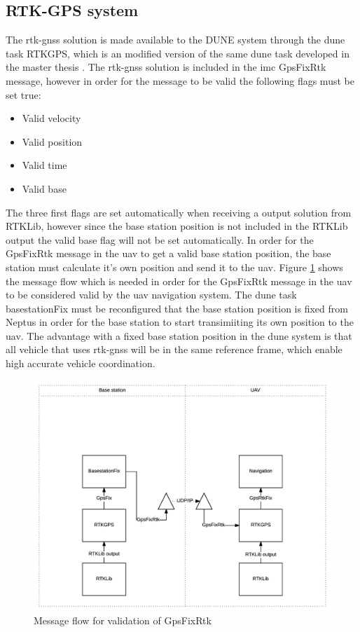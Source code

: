\subsection{RTK-GPS system}\label{ss:RTK-GPS system}
The \gls{rtk-gnss} solution is made available to the DUNE system through the \gls{dune} task RTKGPS, which is an modified version of the same \gls{dune} task developed in the master thesis \citep{Spockeli}. The \gls{rtk-gnss} solution is included in the \gls{imc} GpsFixRtk message, however in order for the message to be valid the following flags must be set true:
\begin{table}[H]
\begin{itemize}[noitemsep]
\item Valid velocity
\item Valid position
\item Valid time
\item Valid base
\end{itemize}
\end{table}
The three first flags are set automatically when receiving a output solution from RTKLib, however since the base station position is not included in the RTKLib output the valid base flag will not be set automatically. In order for the GpsFixRtk message in the \gls{uav} to get a valid base station position, the base station must calculate it's own position and send it to the \gls{uav}. Figure \ref{Fig:ValidationGpsFixRtk} shows the message flow which is needed in order for the GpsFixRtk message in the \gls{uav} to be considered valid by the \gls{uav} navigation system. The \gls{dune} task basestationFix must be reconfigured that the base station position is fixed from Neptus in order for the base station to start transimiiting its own position to the \gls{uav}. The advantage with a fixed base station position in the \gls{dune} system is that all vehicle that uses \gls{rtk-gnss} will be in the same reference frame, which enable high accurate vehicle coordination.
\begin{figure}[H]
\centering
\includegraphics[scale=0.7]{figs/ValidationGpsFixRtk.png}
\caption{Message flow for validation of GpsFixRtk}
\label{Fig:ValidationGpsFixRtk}
\end{figure}
